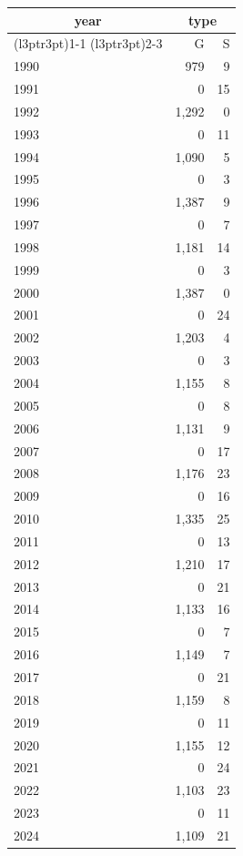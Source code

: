 \footnotesize\begin{tabular}[t]{lrr}
\toprule
\multicolumn{1}{c}{year} & \multicolumn{2}{c}{type} \\
\cmidrule(l{3pt}r{3pt}){1-1} \cmidrule(l{3pt}r{3pt}){2-3}
  & G & S\\
\midrule
1990 & 979 & 9\\
1991 & 0 & 15\\
1992 & 1,292 & 0\\
1993 & 0 & 11\\
1994 & 1,090 & 5\\
1995 & 0 & 3\\
1996 & 1,387 & 9\\
1997 & 0 & 7\\
1998 & 1,181 & 14\\
1999 & 0 & 3\\
2000 & 1,387 & 0\\
2001 & 0 & 24\\
2002 & 1,203 & 4\\
2003 & 0 & 3\\
2004 & 1,155 & 8\\
2005 & 0 & 8\\
2006 & 1,131 & 9\\
2007 & 0 & 17\\
2008 & 1,176 & 23\\
2009 & 0 & 16\\
2010 & 1,335 & 25\\
2011 & 0 & 13\\
2012 & 1,210 & 17\\
2013 & 0 & 21\\
2014 & 1,133 & 16\\
2015 & 0 & 7\\
2016 & 1,149 & 7\\
2017 & 0 & 21\\
2018 & 1,159 & 8\\
2019 & 0 & 11\\
2020 & 1,155 & 12\\
2021 & 0 & 24\\
2022 & 1,103 & 23\\
2023 & 0 & 11\\
2024 & 1,109 & 21\\
\bottomrule
\end{tabular}
